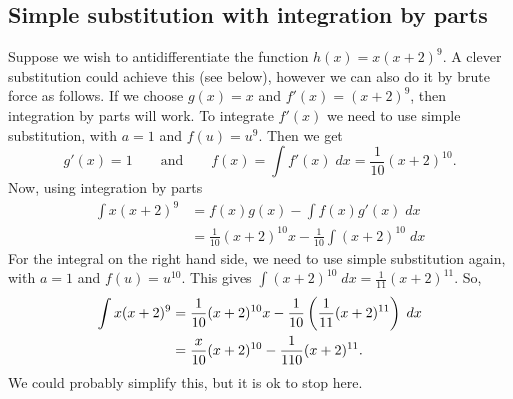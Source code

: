\subsection{Simple substitution with integration by parts}
Suppose we wish to antidifferentiate the function $h(x) = x(x+2)^9$. A clever substitution could achieve this (see below), however we can also do it by brute force as follows. If we choose $g(x) = x$ and $f'(x) = (x+2)^9$, then integration by parts will work. To integrate $f'(x)$ we need to use simple substitution, with $a = 1$ and $f(u) = u^9$. Then we get
\[
g'(x) = 1 \qquad \text{and} \qquad f(x) = \int f'(x) \; dx = \frac{1}{10}(x+2)^{10}.
\]
Now, using integration by parts
\begin{align*}
\int x(x+2)^9 & = f(x)g(x) - \int f(x)g'(x) \; dx \\
	& = \frac{1}{10}(x+2)^{10}x -  \frac{1}{10} \int (x+2)^{10} \; dx \tag{linearity}
\end{align*}
For the integral on the right hand side, we need to use simple substitution again, with $a = 1$ and $f(u) = u^{10}$. This gives $\int (x+2)^{10} \; dx = \frac{1}{11}(x+2)^{11}$. So,
\begin{align*}
\int x(x+2)^9 & =  \frac{1}{10}(x+2)^{10}x -  \frac{1}{10}\left(\frac{1}{11} (x+2)^{11}\right) \; dx \\
	& = \frac{x}{10}(x+2)^{10} - \frac{1}{110}(x+2)^{11}.
\end{align*}
We could probably simplify this, but it is ok to stop here.

